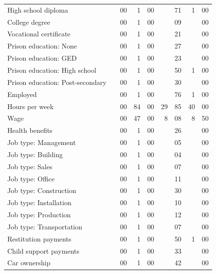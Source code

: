 \begin{table}[h]
\begin{center}
\begin{tabular}{lr@{.}lr@{.}lr@{.}lr@{.}l}
  High school diploma                 &    & 00 &  1 & 00 &    & 71 &  1 & 00 \\
  College degree                      &    & 00 &  1 & 00 &    & 09 &    & 00 \\
  Vocational certificate              &    & 00 &  1 & 00 &    & 21 &    & 00 \\
  Prison education: None              &    & 00 &  1 & 00 &    & 27 &    & 00 \\
  Prison education: GED               &    & 00 &  1 & 00 &    & 23 &    & 00 \\
  Prison education: High school       &    & 00 &  1 & 00 &    & 50 &  1 & 00 \\
  Prison education: Post-secondary    &    & 00 &  1 & 00 &    & 30 &    & 00 \\
  Employed                  &    & 00 &  1 & 00 &    & 76 &  1 & 00 \\
  Hours per week            &    & 00 & 84 & 00 & 29 & 85 & 40 & 00 \\
  Wage                      &    & 00 & 47 & 00 &  8 & 08 &  8 & 50 \\
  Health benefits           &    & 00 &  1 & 00 &    & 26 &    & 00 \\
  Job type: Management      &    & 00 &  1 & 00 &    & 05 &    & 00 \\
  Job type: Building        &    & 00 &  1 & 00 &    & 04 &    & 00 \\
  Job type: Sales           &    & 00 &  1 & 00 &    & 07 &    & 00 \\
  Job type: Office          &    & 00 &  1 & 00 &    & 11 &    & 00 \\
  Job type: Construction    &    & 00 &  1 & 00 &    & 30 &    & 00 \\
  Job type: Installation    &    & 00 &  1 & 00 &    & 10 &    & 00 \\
  Job type: Production      &    & 00 &  1 & 00 &    & 12 &    & 00 \\
  Job type: Transportation  &    & 00 &  1 & 00 &    & 07 &    & 00 \\
  Restitution payments      &    & 00 &  1 & 00 &    & 50 &  1 & 00 \\
  Child support payments    &    & 00 &  1 & 00 &    & 33 &    & 00 \\
  Car ownership             &    & 00 &  1 & 00 &    & 42 &    & 00 \\
  \hline
\end{tabular}
\end{center}
\end{table}

